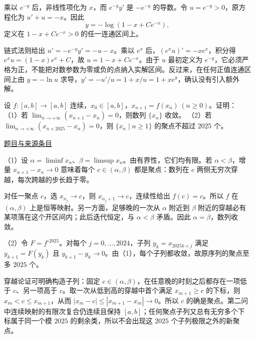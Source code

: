 \documentclass[UTF8,12pt,a4paper,fontset=fandol]{ctexart}
\begin{document}
\begin{solve}\label{ans:fin16-high:4}

乘以 $e^{-y}$ 后，非线性项化为 $x$，而 $e^{-y}y'$ 是 $-e^{-y}$ 的导数。令 $u=e^{-y}>0$，原方程化为 $u'+u=-x$。因此
\[
\boxed{y=-\log(1-x+Ce^{-x})},
\]
定义在 $1-x+Ce^{-x}>0$ 的任一连通区间上。

链式法则给出 $u'=-e^{-y}y'=-u-x$。乘以 $e^x$ 后，$(e^xu)'=-xe^x$，积分得 $e^xu=(1-x)e^x+C$，故 $u=1-x+Ce^{-x}$。由于 $u$ 最初定义为 $e^{-y}$，它必须严格为正，不能把对数参数为零或负的点纳入实解区间。反过来，在任何正值连通区间上由 $y=-\ln u$ 求导，$y'=-u'/u=1+x/u=1+xe^y$，确认没有引入额外解。

\end{solve}

\begin{example}[来源序号7]\label{ex:fin16-high:7}\label{pr:fin16-high:7}

设 $f : [a,b] \rightarrow [a,b]$ 连续，$x_0 \in [a,b]$，$x_{n+1} = f(x_n)\ (n \geq 0)$。证明：
（1）若 $\lim_{n \rightarrow +\infty} (x_{n+1} - x_n) = 0$，则数列 $\{x_n\}$ 收敛。
（2）若 $\lim_{n \rightarrow +\infty} (x_{n+2025} - x_n) = 0$，则 $\{x_n \mid n \geq 1\}$ 的聚点不超过 2025 个。

\par\href{https://github.com/lzxcr/cmc-mathematics/blob/64916fa1fdbc3e444a652eca204d5669058ee321/src/problems/finals/16/07.md}{题目与来源条目}

\end{example}

\begin{solve}\label{ans:fin16-high:7}

（1）设 $\alpha=\liminf x_n$、$\beta=\limsup x_n$。由有界性，它们均有限。若 $\alpha<\beta$，增量 $x_{n+1}-x_n\to0$ 意味着每个 $c\in(\alpha,\beta)$ 都是聚点：数列在 $c$ 两侧无穷次穿越，每次跨越的步长趋于零。

对任一聚点 $c$，选 $x_{n_j}\to c$，则 $x_{n_j+1}\to c$，连续性给出 $f(c)=c$。所以 $f$ 在 $(\alpha,\beta)$ 上是恒等映射。另一方面，足够晚的一次从 $\alpha$ 附近到 $\beta$ 附近的穿越必有某项落在这个开区间内；此后迭代恒定，与 $\alpha<\beta$ 矛盾。因此 $\alpha=\beta$，数列收敛。

（2）令 $F=f^{\circ2025}$。对每个 $j=0,\dots,2024$，子列 $y_k=x_{2025k+j}$ 满足 $y_{k+1}=F(y_k)$ 且 $y_{k+1}-y_k\to0$。由（1），每个子列都收敛，故原序列的聚点至多 $2025$ 个。

穿越论证可明确构造子列：固定 $c\in(\alpha,\beta)$，在任意晚的时刻之后都存在一项低于 $c$、另一项高于 $c$。取一次从低到高的穿越中首个满足 $x_{m+1}\ge c$ 的下标，则 $x_m<c\le x_{m+1}$，从而 $|x_m-c|\le|x_{m+1}-x_m|\to0$。所以 $c$ 的确是聚点。第二问中连续映射的有限次复合仍连续且保持 $[a,b]$；任何聚点子列又总有无穷多个下标属于同一个模 $2025$ 的剩余类，所以不会出现这 $2025$ 个子列极限之外的新聚点。

\end{solve}
\end{document}
